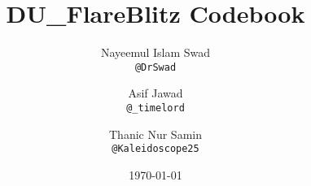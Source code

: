 \documentclass[10pt]{article}
\title{\vspace{8ex}\Large{DU\_FlareBlitz Codebook}}
\author{
Nayeemul Islam Swad\\
\texttt{@DrSwad}
\and
Asif Jawad\\
\texttt{@\_timelord}
\and
Thanic Nur Samin\\
\texttt{@Kaleidoscope25}
\and
}
\date{\today}
\begin{document}
\begin{landscape}
\begin{multicols}{2}

\maketitle
\tableofcontents
\pagestyle{fancy}

\begin{figure}[t]

\centering
\end{figure}



\end{multicols}
\end{landscape}
\end{document}
